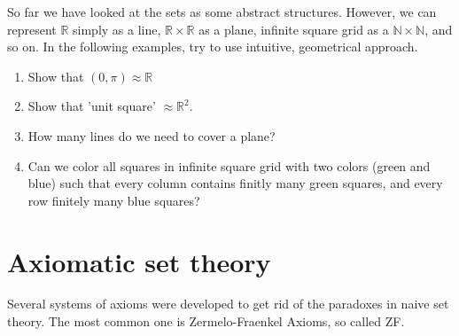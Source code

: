 \documentclass[11pt,a5paper]{article}
\begin{document}
\noindent So far we have looked at the sets as some abstract structures. However, we can represent $\mathbb{R}$ simply as a line, $\mathbb{R}\times\mathbb{R}$ as a plane, infinite square grid as a $\mathbb{N}\times\mathbb{N}$, and so on. In the following examples, try to use intuitive, geometrical approach.
\begin{enumerate}
  \item Show that $(0,\pi)\approx\mathbb{R}$
  \item Show that 'unit square' $\approx\mathbb{R}^2$.
  \item How many lines do we need to cover a plane?
  \item Can we color all squares in infinite square grid with two colors (green and blue) such that every column contains finitly many green squares, and every row finitely many blue squares?
\end{enumerate}

\section{Axiomatic set theory}

Several systems of axioms were developed to get rid of the paradoxes in naive set theory. The most common one is Zermelo-Fraenkel Axioms, so called ZF.
\end{document}
